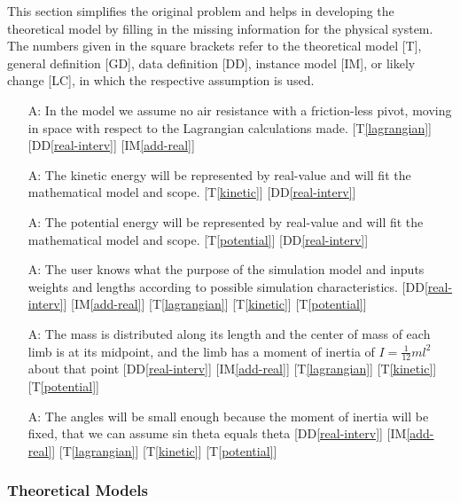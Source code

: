 \documentclass[12pt]{article}
\newcommand{\ddref}[1]{DD\ref{#1}}
\newcommand{\tref}[1]{T\ref{#1}}
\newcounter{assumpnum} %
\newcommand{\iref}[1]{IM\ref{#1}}
\begin{document}
This section simplifies the original problem and helps in developing the
theoretical model by filling in the missing information for the physical
system. The numbers given in the square brackets refer to the theoretical model
[T], general definition [GD], data definition [DD], instance model [IM], or
likely change [LC], in which the respective assumption is used.

\begin{itemize}
\item[A\refstepcounter{assumpnum}\theassumpnum \label{A:equation}:]
In the model we assume no air resistance with a friction-less pivot, moving in
space with respect to the Lagrangian calculations made. [\tref{lagrangian}]
[\ddref{real-interv}] [\iref{add-real}]
\item[A\refstepcounter{assumpnum}\theassumpnum \label{A:kinetic}:]
The kinetic energy will be represented by real-value and will fit the 
mathematical model and scope. [\tref{kinetic}] [\ddref{real-interv}]
\item[A\refstepcounter{assumpnum}\theassumpnum \label{A:poten}:]
The potential energy will be represented by real-value and will fit the 
mathematical model and scope. [\tref{potential}] [\ddref{real-interv}]
\item[A\refstepcounter{assumpnum}\theassumpnum \label{A:init-user}:]
The user knows what the purpose of the simulation model and inputs weights and 
lengths according to possible simulation characteristics. 
[\ddref{real-interv}] [\iref{add-real}] [\tref{lagrangian}] [\tref{kinetic}]
[\tref{potential}]
\item[A\refstepcounter{assumpnum}\theassumpnum \label{A:centered}:]
The mass is distributed along its length and the center 
of mass of each limb is at its midpoint, and the limb has a moment of inertia 
of $I = \frac{1}{12}ml^2$ about that point
[\ddref{real-interv}] [\iref{add-real}] [\tref{lagrangian}] [\tref{kinetic}]
[\tref{potential}]
\item[A\refstepcounter{assumpnum}\theassumpnum \label{A:init-angle}:]
The angles will be small enough because the moment of inertia will be fixed,
that we can assume sin theta equals theta
[\ddref{real-interv}] [\iref{add-real}] [\tref{lagrangian}] [\tref{kinetic}]
[\tref{potential}]
\end{itemize}

\newpage

\subsubsection{Theoretical Models}\label{sec_theoretical}
\end{document}
